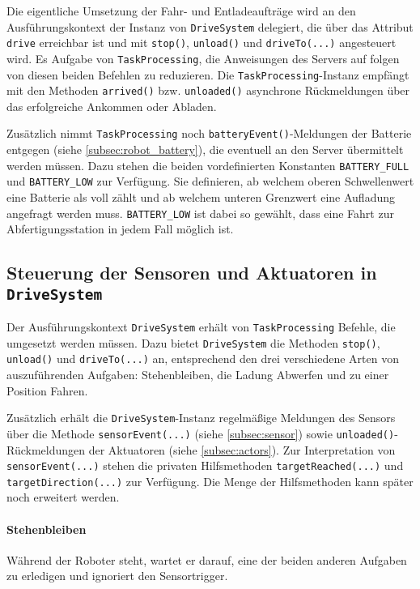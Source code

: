 Die eigentliche Umsetzung der Fahr- und Entladeaufträge wird an den Ausführungskontext der Instanz von \texttt{DriveSystem} delegiert, die über das Attribut \texttt{drive} erreichbar ist und mit \texttt{stop()}, \texttt{unload()} und \texttt{driveTo(...)} angesteuert wird.
Es Aufgabe von \texttt{TaskProcessing}, die Anweisungen des Servers auf folgen von diesen beiden Befehlen zu reduzieren.
Die \texttt{TaskProcessing}-Instanz empfängt mit den Methoden \texttt{arrived()} bzw. \texttt{unloaded()} asynchrone Rückmeldungen über das erfolgreiche Ankommen oder Abladen.

Zusätzlich nimmt \texttt{TaskProcessing} noch \texttt{batteryEvent()}-Meldungen der Batterie entgegen (siehe \autoref{subsec:robot_battery}), die eventuell an den Server übermittelt werden müssen. Dazu stehen die beiden vordefinierten Konstanten \texttt{BATTERY\_FULL} und \texttt{BATTERY\_LOW} zur Verfügung. Sie definieren, ab welchem oberen Schwellenwert eine Batterie als voll zählt und ab welchem unteren Grenzwert eine Aufladung angefragt werden muss. \texttt{BATTERY\_LOW} ist dabei so gewählt, dass eine Fahrt zur Abfertigungsstation in jedem Fall möglich ist. 






\subsection{Steuerung der Sensoren und Aktuatoren in \texttt{DriveSystem}}
\label{subsec:robot_drive}

Der Ausführungskontext \texttt{DriveSystem} erhält von \texttt{TaskProcessing} Befehle, die umgesetzt werden müssen.
Dazu bietet \texttt{DriveSystem} die Methoden \texttt{stop()}, \texttt{unload()} und \texttt{driveTo(...)} an, entsprechend den drei verschiedene Arten von auszuführenden Aufgaben: Stehenbleiben, die Ladung Abwerfen und zu einer Position Fahren.

Zusätzlich erhält die \texttt{DriveSystem}-Instanz regelmäßige Meldungen des Sensors über die Methode \texttt{sensorEvent(...)} (siehe \autoref{subsec:sensor}) sowie \texttt{unloaded()}-Rückmeldungen der Aktuatoren (siehe \autoref{subsec:actors}).
Zur Interpretation von \texttt{sensorEvent(...)} stehen die privaten Hilfsmethoden \texttt{targetReached(...)} und \texttt{targetDirection(...)} zur Verfügung. Die Menge der Hilfsmethoden kann später noch erweitert werden.


\paragraph{Stehenbleiben}
Während der Roboter steht, wartet er darauf, eine der beiden anderen Aufgaben zu erledigen und ignoriert den Sensortrigger. 


